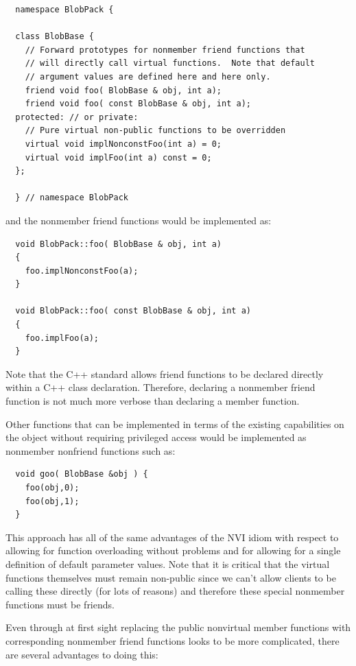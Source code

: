 \documentclass[pdf,ps2pdf,11pt]{SANDreport}
\begin{document}
{\small\begin{verbatim}
  namespace BlobPack {

  class BlobBase {
    // Forward prototypes for nonmember friend functions that
    // will directly call virtual functions.  Note that default
    // argument values are defined here and here only.
    friend void foo( BlobBase & obj, int a);
    friend void foo( const BlobBase & obj, int a);
  protected: // or private:
    // Pure virtual non-public functions to be overridden
    virtual void implNonconstFoo(int a) = 0;
    virtual void implFoo(int a) const = 0;
  };

  } // namespace BlobPack
\end{verbatim}}

{}\noindent{}and the nonmember friend functions would be implemented as:

{\small\begin{verbatim}
  void BlobPack::foo( BlobBase & obj, int a)
  {
    foo.implNonconstFoo(a);
  }

  void BlobPack::foo( const BlobBase & obj, int a)
  {
    foo.implFoo(a);
  }
\end{verbatim}}

Note that the C++ standard allows friend functions to be declared directly
within a C++ class declaration.  Therefore, declaring a nonmember friend
function is not much more verbose than declaring a member function.

Other functions that can be implemented in terms of the existing capabilities
on the object without requiring privileged access would be implemented as
nonmember nonfriend functions such as:

{\small\begin{verbatim}
  void goo( BlobBase &obj ) {
    foo(obj,0);
    foo(obj,1);
  }
\end{verbatim}}

This approach has all of the same advantages of the NVI idiom with respect to
allowing for function overloading without problems and for allowing
for a single definition of default parameter values.  Note that it is critical
that the virtual functions themselves must remain non-public since we can't
allow clients to be calling these directly (for lots of reasons) and therefore
these special nonmember functions must be friends.

Even through at first sight replacing the public nonvirtual member functions
with corresponding nonmember friend functions looks to be more complicated,
there are several advantages to doing this:
\end{document}
